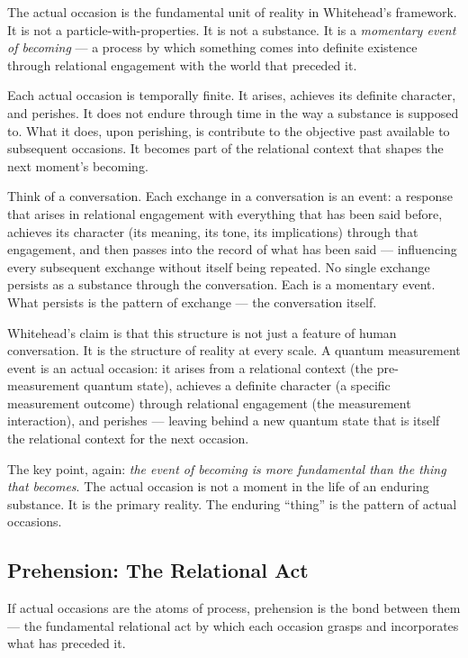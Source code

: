 The actual occasion is the fundamental unit of reality in Whitehead's framework. It is not a particle-with-properties. It is not a substance. It is a \emph{momentary event of becoming} --- a process by which something comes into definite existence through relational engagement with the world that preceded it.

Each actual occasion is temporally finite. It arises, achieves its definite character, and perishes. It does not endure through time in the way a substance is supposed to. What it does, upon perishing, is contribute to the objective past available to subsequent occasions. It becomes part of the relational context that shapes the next moment's becoming.

Think of a conversation. Each exchange in a conversation is an event: a response that arises in relational engagement with everything that has been said before, achieves its character (its meaning, its tone, its implications) through that engagement, and then passes into the record of what has been said --- influencing every subsequent exchange without itself being repeated. No single exchange persists as a substance through the conversation. Each is a momentary event. What persists is the pattern of exchange --- the conversation itself.

Whitehead's claim is that this structure is not just a feature of human conversation. It is the structure of reality at every scale. A quantum measurement event is an actual occasion: it arises from a relational context (the pre-measurement quantum state), achieves a definite character (a specific measurement outcome) through relational engagement (the measurement interaction), and perishes --- leaving behind a new quantum state that is itself the relational context for the next occasion.

The key point, again: \emph{the event of becoming is more fundamental than the thing that becomes}. The actual occasion is not a moment in the life of an enduring substance. It is the primary reality. The enduring ``thing'' is the pattern of actual occasions.

\subsection*{Prehension: The Relational Act}

If actual occasions are the atoms of process, prehension is the bond between them --- the fundamental relational act by which each occasion grasps and incorporates what has preceded it.

